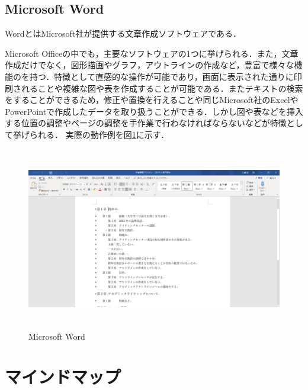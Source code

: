 \documentclass[a4j,12pt]{jarticle}
\begin{document}
\newpage
\subsection{Microsoft Word}
WordとはMicrosoft社が提供する文章作成ソフトウェアである．

Microsoft Officeの中でも，主要なソフトウェアの1つに挙げられる．また，文章作成だけでなく，図形描画やグラフ，アウトラインの作成など，豊富で様々な機能のを持つ．特徴として直感的な操作が可能であり，画面に表示された通りに印刷されることや複雑な図や表を作成することが可能である．またテキストの検索をすることができるため，修正や置換を行えることや同じMicrosoft社のExcelやPowerPointで作成したデータを取り扱うことができる．しかし図や表などを挿入する位置の調整やページの調整を手作業で行わなければならないなどが特徴として挙げられる．
実際の動作例を図\ref{fig:d}に示す．

\begin{figure}[H]
\begin{center}
 \includegraphics[clip,width=120mm,height=80mm]{figure/word.png}
 \end{center}
 \caption{Microsoft Word}
 \label{fig:d}
\end{figure}

\newpage
\section{マインドマップ}
\end{document}
